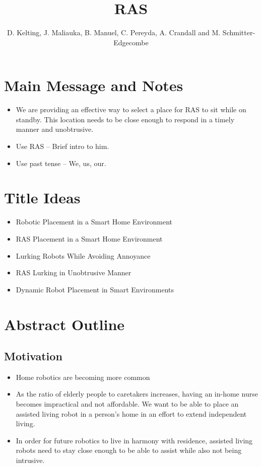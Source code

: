 \documentclass[11pt, draft, a4paper]{IEEEtran}
\author{D. Kelting, J. Maliauka, B. Manuel, C. Pereyda, A. Crandall and M. Schmitter-Edgecombe}
\title{RAS}
\begin{document}
\maketitle

\section{Main Message and Notes}
\begin{itemize}
        \item We are providing an effective way to select a place for RAS to sit while on standby. This location needs to be close enough to respond in a timely manner and unobtrusive.
        \item Use RAS -- Brief intro to him.
        \item Use past tense -- We, us, our.
\end{itemize}


\section{Title Ideas}
\begin{itemize}
        \item Robotic Placement in a Smart Home Environment
        \item RAS Placement in a Smart Home Environment 
        \item Lurking Robots While Avoiding Annoyance
        \item RAS Lurking in Unobtrusive Manner
        \item Dynamic Robot Placement in Smart Environments
\end{itemize}


\section{Abstract Outline}


\subsection{Motivation}
\begin{itemize}
    \item Home robotics are becoming more common
    \item As the ratio of elderly people to caretakers increases, having an 
        in-home nurse becomes impractical and not affordable. We want to be able to place an assisted living robot in a person's home in an effort to extend independent living.
    \item In order for future robotics to live in harmony with residence, assisted living robots need to stay close enough to be able to assist while also not being intrusive. 
\end{itemize}
\end{document}
